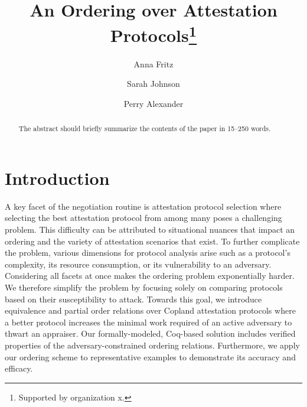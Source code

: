 \documentclass[runningheads]{llncs}
\theoremstyle{definition}
\begin{document}
%
\title{An Ordering over Attestation Protocols\thanks{Supported by organization x.}}
%
%
\author{Anna Fritz \and
Sarah Johnson \and
Perry Alexander}
%
%
%
\maketitle              %
%
\begin{abstract}
The abstract should briefly summarize the contents of the paper in
15--250 words.

\end{abstract}
%
%
%
\section{Introduction}
A key facet of the negotiation routine is attestation protocol selection where selecting the best attestation protocol from among many poses a challenging problem. This difficulty can be attributed to situational nuances that impact an ordering and the variety of attestation scenarios that exist. To further complicate the problem, various dimensions for protocol analysis arise such as a protocol's complexity, its resource consumption, or its vulnerability to an adversary. Considering all facets at once makes the ordering problem exponentially harder. We therefore simplify the problem by focusing solely on comparing protocols based on their susceptibility to attack. Towards this goal, we introduce equivalence and partial order relations over Copland attestation protocols where a better protocol increases the minimal work required of an active adversary to thwart an appraiser. Our formally-modeled, Coq-based solution includes verified properties of the adversary-constrained ordering relations. Furthermore, we apply our ordering scheme to representative examples to demonstrate its accuracy and efficacy.
\end{document}
